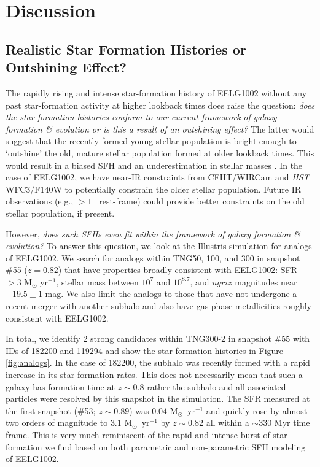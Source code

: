 \documentclass[twocolumn,tight,times,linenumbers]{aastex631}
\newcommand{\msol}{M$_\odot$}
\begin{document}
			



		\section{Discussion}
            \label{sec:discussion}
		
		\subsection{Realistic Star Formation Histories or Outshining Effect?}
		The rapidly rising and intense star-formation history of EELG1002 without any past star-formation activity at higher lookback times does raise the question: \textit{does the star formation histories conform to our current framework of galaxy formation \& evolution or is this a result of an outshining effect?} The latter would suggest that the recently formed young stellar population is bright enough to `outshine' the old, mature stellar population formed at older lookback times. This would result in a biased SFH and an underestimation in stellar masses \citep{Narayanan2024}. In the case of EELG1002, we have near-IR constraints from CFHT/WIRCam and \textit{HST} WFC3/F140W to potentially constrain the older stellar population. Future IR observations (e.g., $> 1$ \micron~rest-frame) could provide better constraints on the old stellar population, if present.
			
		However, \textit{does such SFHs even fit within the framework of galaxy formation \& evolution?} To answer this question, we look at the Illustris simulation \citep{Genel2014,Vogelsberger2014,Vogelsberger2014_galpop,Nelson2015} for analogs of EELG1002. We search for analogs within TNG50, 100, and 300 in snapshot \#55 ($z = 0.82$) that have properties broadly consistent with EELG1002: SFR $> 3$ M$_\odot$ yr$^{-1}$, stellar mass between $10^7$ and $10^{8.7}$, and $ugriz$ magnitudes near $-19.5\pm1$ mag. We also limit the analogs to those that have not undergone a recent merger with another subhalo and also have gas-phase metallicities roughly consistent with EELG1002. 
		
		In total, we identify 2 strong candidates within TNG300-2 in snapshot \#55 with IDs of 182200 and 119294 and show the star-formation histories in Figure \ref{fig:analogs}. In the case of 182200, the subhalo was recently formed with a rapid increase in its star formation rates. This does not necessarily mean that such a galaxy has formation time at $z \sim 0.8$ rather the subhalo and all associated particles were resolved by this snapshot in the simulation. The SFR measured at the first snapshot (\#53; $z \sim 0.89$) was $0.04$ \msol~yr$^{-1}$ and quickly rose by almost two orders of magnitude to $3.1$ \msol~yr$^{-1}$ by $z \sim 0.82$ all within a $\sim 330$ Myr time frame. This is very much reminiscent of the rapid and intense burst of star-formation we find based on both parametric and non-parametric SFH modeling of EELG1002.
		
\end{document}
